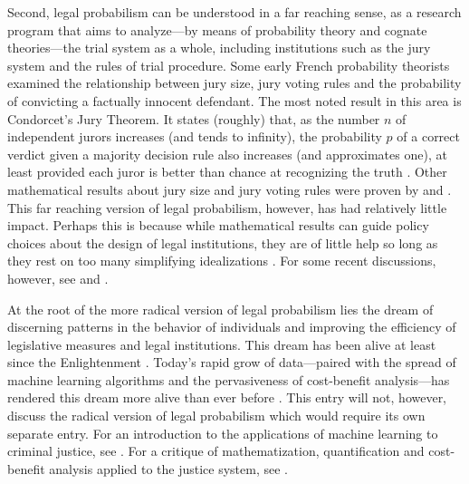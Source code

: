 \documentclass{article}
\begin{document}
Second, legal probabilism can be understood in a far reaching sense, as a research program that aims to analyze---by means of probability theory and cognate theories---the trial system as a whole, including institutions such as the jury system and the rules of trial procedure. Some early French probability theorists examined the relationship between jury size, jury voting rules and the probability of convicting a factually innocent defendant. The most noted result in this area is Condorcet's Jury Theorem.  It states (roughly) that, as the number $n$ of independent jurors increases (and tends to infinity), the probability $p$ of a correct verdict given a majority decision rule also increases (and approximates one), at least provided each juror is better than chance at recognizing the truth
\citep{condorcet1785}.
Other mathematical results about jury size and jury voting rules were proven by \cite{Laplace1814} and \cite{Poisson1837}. This far reaching version of legal probabilism, however,  has had relatively little impact. Perhaps this is because while  mathematical results can guide policy choices about the design of legal institutions, they are of little help so long as they rest on too many simplifying idealizations
\citep{kaye1980}.  For some recent discussions, however,  see \citep{nitzan2010} and \citep{suzuki2015}. 
%

At the root of the more radical version of legal probabilism lies the dream of discerning patterns in the behavior of individuals and improving the efficiency of legislative measures and legal institutions. This dream has been alive at least since the Enlightenment \citep{hacking1990}. Today's rapid grow of data---paired with the spread of machine learning algorithms and the pervasiveness of cost-benefit analysis---has rendered  this dream more alive than ever before \citep{ferguson2020bigdata}. This entry will not, however, discuss the radical version of legal probabilism which would require its own separate entry. For an introduction to the applications of machine learning to criminal justice, see \citep{berk2018book}. 
For a critique of mathematization, quantification and cost-benefit analysis applied to the justice system, see \citep{harcourt2018}.



 
\end{document}
